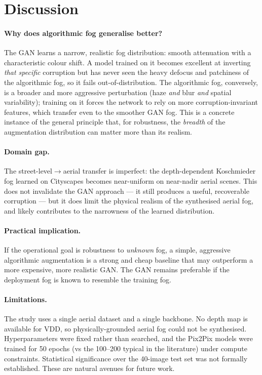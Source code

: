 \documentclass[11pt,a4paper]{article}
\begin{document}
\section{Discussion}

\paragraph{Why does algorithmic fog generalise better?}
The GAN learns a narrow, realistic fog distribution: smooth attenuation with a
characteristic colour shift. A model trained on it becomes excellent at
inverting \emph{that specific} corruption but has never seen the heavy defocus
and patchiness of the algorithmic fog, so it fails out-of-distribution. The
algorithmic fog, conversely, is a broader and more aggressive perturbation
(haze \emph{and} blur \emph{and} spatial variability); training on it forces
the network to rely on more corruption-invariant features, which transfer even
to the smoother GAN fog. This is a concrete instance of the general principle
that, for robustness, the \emph{breadth} of the augmentation distribution can
matter more than its realism.

\paragraph{Domain gap.}
The street-level$\rightarrow$aerial transfer is imperfect: the depth-dependent
Koschmieder fog learned on Cityscapes becomes near-uniform on near-nadir aerial
scenes. This does not invalidate the GAN approach --- it still produces a
useful, recoverable corruption --- but it does limit the physical realism of
the synthesised aerial fog, and likely contributes to the narrowness of the
learned distribution.

\paragraph{Practical implication.}
If the operational goal is robustness to \emph{unknown} fog, a simple,
aggressive algorithmic augmentation is a strong and cheap baseline that may
outperform a more expensive, more realistic GAN. The GAN remains preferable if
the deployment fog is known to resemble the training fog.

\paragraph{Limitations.}
The study uses a single aerial dataset and a single backbone. No depth map is
available for VDD, so physically-grounded aerial fog could not be synthesised.
Hyperparameters were fixed rather than searched, and the Pix2Pix models were
trained for 50 epochs (vs the 100--200 typical in the literature) under compute
constraints. Statistical significance over the 40-image test set was not
formally established. These are natural avenues for future work.
\end{document}
